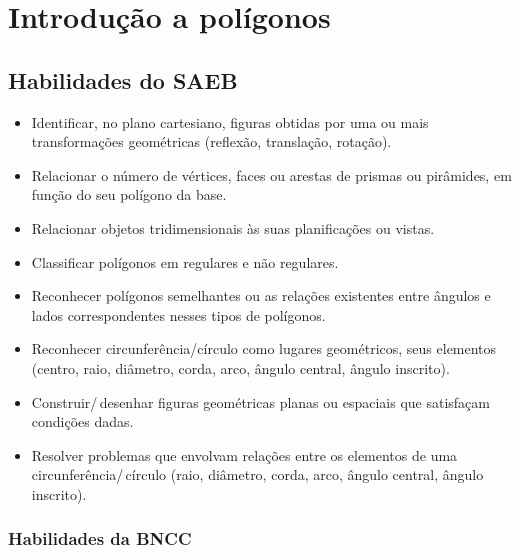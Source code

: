 
\chapter{Introdução a polígonos}

\section{Habilidades do SAEB} 
\begin{itemize}
\item Identificar, no plano cartesiano, figuras obtidas
por uma ou mais transformações geométricas (reflexão, translação,
rotação).
\item
  Relacionar o número de vértices, faces ou arestas de prismas ou
  pirâmides, em função do seu polígono da base.
\item
  Relacionar objetos tridimensionais às suas planificações ou vistas.
\item
  Classificar polígonos em regulares e não regulares.
\item
  Reconhecer polígonos semelhantes ou as relações existentes entre
  ângulos e lados correspondentes nesses tipos de polígonos.
\item
  Reconhecer circunferência/círculo como lugares geométricos, seus
  elementos (centro, raio, diâmetro, corda, arco, ângulo central, ângulo
  inscrito).
\item
  Construir/\,desenhar figuras geométricas planas ou espaciais que
  satisfaçam condições dadas.
\item
  Resolver problemas que envolvam relações entre os elementos de uma
  circunferência/\,círculo (raio, diâmetro, corda, arco, ângulo central,
  ângulo inscrito).
\end{itemize}

\subsection{Habilidades da BNCC}

